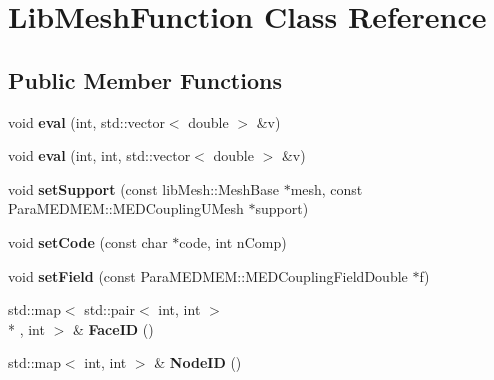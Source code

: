 \hypertarget{class_lib_mesh_function}{\section{Lib\-Mesh\-Function Class Reference}
\label{class_lib_mesh_function}
}
\subsection*{Public Member Functions}
\begin{DoxyCompactItemize}
\item 
\hypertarget{class_lib_mesh_function_a8c22f2e9dc4e255dfc8888e38fe9d688}{void {\bfseries eval} (int, std\-::vector$<$ double $>$ \&v)}\label{class_lib_mesh_function_a8c22f2e9dc4e255dfc8888e38fe9d688}

\item 
\hypertarget{class_lib_mesh_function_a9df4401cfbd9c27ace6dcdd441a18787}{void {\bfseries eval} (int, int, std\-::vector$<$ double $>$ \&v)}\label{class_lib_mesh_function_a9df4401cfbd9c27ace6dcdd441a18787}

\item 
\hypertarget{class_lib_mesh_function_a0778d03df178e86de022c893c1b1a397}{void {\bfseries set\-Support} (const lib\-Mesh\-::\-Mesh\-Base $\ast$mesh, const Para\-M\-E\-D\-M\-E\-M\-::\-M\-E\-D\-Coupling\-U\-Mesh $\ast$support)}\label{class_lib_mesh_function_a0778d03df178e86de022c893c1b1a397}

\item 
\hypertarget{class_lib_mesh_function_a4a9515b721c933221d8ad9e68bc59930}{void {\bfseries set\-Code} (const char $\ast$code, int n\-Comp)}\label{class_lib_mesh_function_a4a9515b721c933221d8ad9e68bc59930}

\item 
\hypertarget{class_lib_mesh_function_a4ed4ba8e51d30b060c926edbdc2cb956}{void {\bfseries set\-Field} (const Para\-M\-E\-D\-M\-E\-M\-::\-M\-E\-D\-Coupling\-Field\-Double $\ast$f)}\label{class_lib_mesh_function_a4ed4ba8e51d30b060c926edbdc2cb956}

\item 
\hypertarget{class_lib_mesh_function_ade0bad107a585542200cdce50396f93e}{std\-::map$<$ std\-::pair$<$ int, int $>$\\*
, int $>$ \& {\bfseries Face\-I\-D} ()}\label{class_lib_mesh_function_ade0bad107a585542200cdce50396f93e}

\item 
\hypertarget{class_lib_mesh_function_a9333f7d3da708de7a14637389c40b75d}{std\-::map$<$ int, int $>$ \& {\bfseries Node\-I\-D} ()}\label{class_lib_mesh_function_a9333f7d3da708de7a14637389c40b75d}


\end{DoxyCompactItemize}
